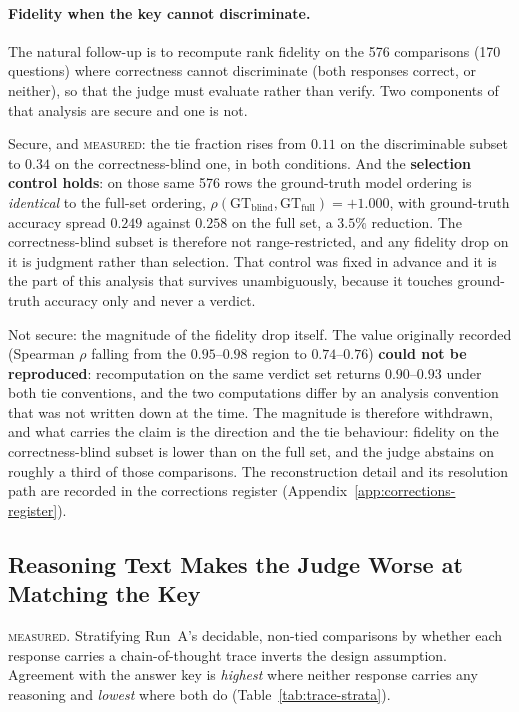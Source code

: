 \paragraph{Fidelity when the key cannot discriminate.}
The natural follow-up is to recompute rank fidelity on the 576
comparisons (170 questions) where correctness cannot discriminate
(both responses correct, or neither), so that the judge must evaluate
rather than verify. Two components of that analysis are secure and one
is not.

Secure, and \textsc{measured}: the tie fraction rises from $0.11$ on
the discriminable subset to $0.34$ on the correctness-blind one, in
both conditions. And the \textbf{selection control holds}: on those same
576 rows the ground-truth model ordering is \emph{identical} to the
full-set ordering, $\rho(\text{GT}_{\text{blind}},
\text{GT}_{\text{full}}) = +1.000$, with ground-truth accuracy spread
$0.249$ against $0.258$ on the full set, a $3.5\%$ reduction. The
correctness-blind subset is therefore not range-restricted, and any
fidelity drop on it is judgment rather than selection. That control was
fixed in advance and it is the part of this analysis that survives
unambiguously, because it touches ground-truth accuracy only and never
a verdict.

Not secure: the magnitude of the fidelity drop itself. The value
originally recorded (Spearman $\rho$ falling from the $0.95$--$0.98$
region to $0.74$--$0.76$) \textbf{could not be reproduced}:
recomputation on the same verdict set returns $0.90$--$0.93$ under
both tie conventions, and the two computations differ by an analysis
convention that was not written down at the time. The magnitude is
therefore withdrawn, and what carries the claim is the direction and
the tie behaviour: fidelity on the correctness-blind subset is lower
than on the full set, and the judge abstains on roughly a third of
those comparisons. The reconstruction detail and its resolution path
are recorded in the corrections register
(Appendix~\ref{app:corrections-register}).

\subsection{Reasoning Text Makes the Judge Worse at Matching the Key}\label{sec:res-trace-inversion}

\textsc{measured.} Stratifying Run~A's decidable, non-tied comparisons
by whether each response carries a chain-of-thought trace inverts the
design assumption. Agreement with the answer key is \emph{highest}
where neither response carries any reasoning and \emph{lowest} where
both do (Table~\ref{tab:trace-strata}).

